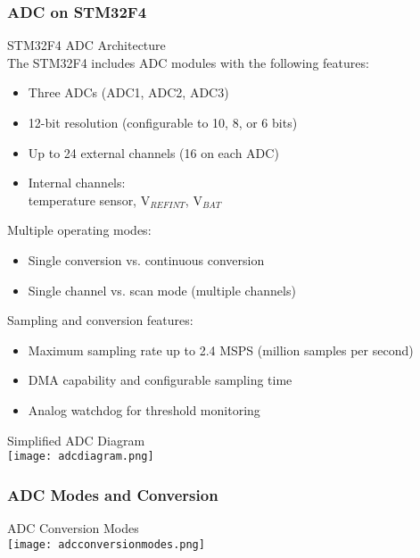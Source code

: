 \subsubsection{ADC on STM32F4}

\begin{concept}{STM32F4 ADC Architecture}\\
The STM32F4 includes ADC modules with the following features:
\begin{itemize}
    \item Three ADCs (ADC1, ADC2, ADC3)
    \item 12-bit resolution (configurable to 10, 8, or 6 bits)
    \item Up to 24 external channels (16 on each ADC)
    \item Internal channels: \\ temperature sensor, V$_{REFINT}$, V$_{BAT}$
\end{itemize}
 Multiple operating modes:
    \begin{itemize}
        \item Single conversion vs. continuous conversion
        \item Single channel vs. scan mode (multiple channels)
    \end{itemize}
Sampling and conversion features:
\begin{itemize}
    \item Maximum sampling rate up to 2.4 MSPS (million samples per second)
    \item DMA capability and configurable sampling time
    \item Analog watchdog for threshold monitoring
\end{itemize}
\end{concept}


\begin{theorem}{Simplified ADC Diagram}\\
    \texttt{[image: adcdiagram.png]}
\end{theorem}


\subsubsection{ADC Modes and Conversion}

\begin{definition}{ADC Conversion Modes}\\
    \texttt{[image: adcconversionmodes.png]}
\end{definition}





